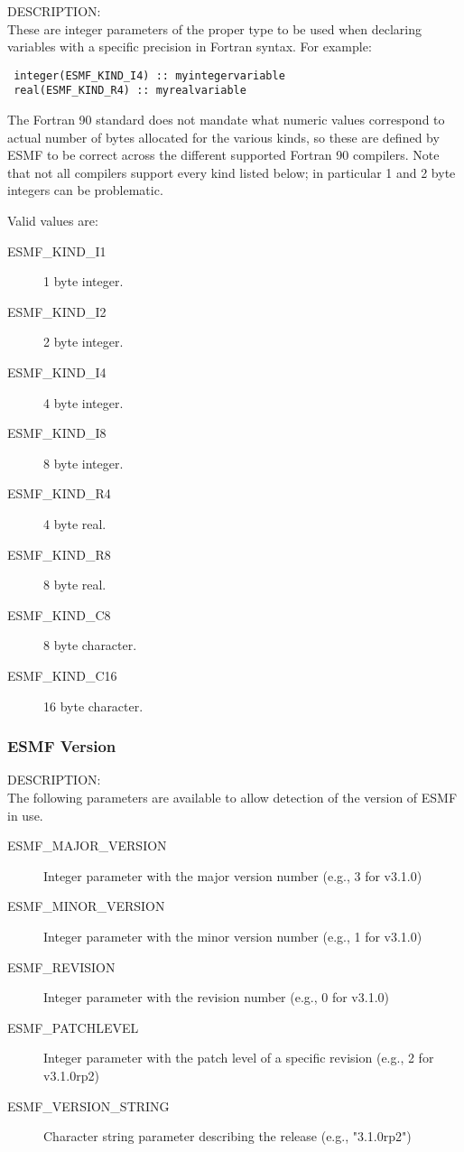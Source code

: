 {\sf DESCRIPTION:\\}
These are integer parameters of the proper type to be
used when declaring variables with a specific precision 
in Fortran syntax.  For example:
\begin{verbatim}
 integer(ESMF_KIND_I4) :: myintegervariable
 real(ESMF_KIND_R4) :: myrealvariable
\end{verbatim}
The Fortran 90 standard does not mandate what numeric values
correspond to actual number of bytes allocated for the
various kinds, so these are defined by ESMF to be correct across
the different supported Fortran 90 compilers.   Note that not
all compilers support every kind listed below; in particular
1 and 2 byte integers can be problematic.

Valid values are:
\begin{description}
\item [ESMF\_KIND\_I1]
      1 byte integer.
\item [ESMF\_KIND\_I2]
      2 byte integer.
\item [ESMF\_KIND\_I4]
      4 byte integer.
\item [ESMF\_KIND\_I8]
      8 byte integer.
\item [ESMF\_KIND\_R4]
      4 byte real.
\item [ESMF\_KIND\_R8]
      8 byte real.
\item [ESMF\_KIND\_C8]
      8 byte character.
\item [ESMF\_KIND\_C16]
      16 byte character.
\end{description}

\subsubsection{ESMF Version}

{\sf DESCRIPTION:\\}
The following parameters are available to allow detection of the
version of ESMF in use.
\begin{description}
\item [ESMF\_MAJOR\_VERSION]
      Integer parameter with the major version number (e.g., 3 for v3.1.0)
\item [ESMF\_MINOR\_VERSION]
      Integer parameter with the minor version number (e.g., 1 for v3.1.0)
\item [ESMF\_REVISION]
      Integer parameter with the revision number (e.g., 0 for v3.1.0)
\item [ESMF\_PATCHLEVEL]
      Integer parameter with the patch level of a specific revision (e.g., 2 for v3.1.0rp2)
\item [ESMF\_VERSION\_STRING]
      Character string parameter describing the release (e.g., "3.1.0rp2")
\end{description}



